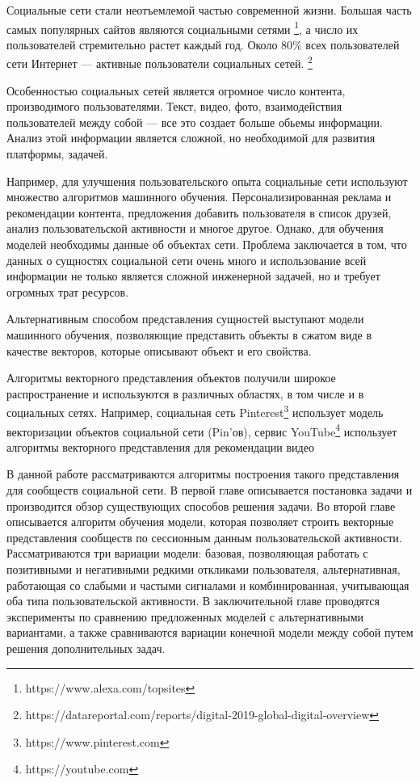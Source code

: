 \documentclass[times,specification,annotation]{itmo-student-thesis}
\begin{document}
\startprefacepage

\startrelatedwork

Социальные сети стали неотъемлемой частью современной жизни. Большая часть самых популярных сайтов являются социальными сетями \footnote{https://www.alexa.com/topsites}, а число их пользователей стремительно растет каждый год. Около 80\% всех пользователей сети Интернет --- активные пользователи социальных сетей. \footnote{https://datareportal.com/reports/digital-2019-global-digital-overview}  

Особенностью социальных сетей является огромное число контента, производимого пользователями. Текст, видео, фото, взаимодействия пользователей между собой --- все это создает больше обьемы информации. Анализ этой информации является сложной, но необходимой для развития платформы, задачей.

Например, для улучшения пользовательского опыта социальные сети используют множество алгоритмов машинного обучения. Персонализированная реклама и рекомендации контента, предложения добавить пользователя в список друзей, анализ пользовательской активности и многое другое. Однако, для обучения моделей необходимы данные об объектах сети. Проблема заключается в том, что данных о сущностях социальной сети очень много и использование всей информации не только является сложной инженерной задачей, но и требует огромных трат ресурсов.   

Альтернативным способом представления сущностей выступают модели машинного обучения, позволяющие представить объекты в сжатом виде в качестве векторов, которые описывают объект и его свойства.

Алгоритмы векторного представления объектов получили широкое распространение и используются в различных областях, в том числе и в социальных сетях. Например, социальная сеть Pinterest\footnote{https://www.pinterest.com} \cite{Liu2017} использует модель векторизации объектов социальной сети (Pin'ов), сервис YouTube\footnote{https://youtube.com} использует алгоритмы векторного представления для рекомендации видео\cite{Covington2016} 

В данной работе рассматриваются алгоритмы построения такого представления для сообществ социальной сети. В первой главе описывается постановка задачи и производится обзор существующих способов решения задачи. Во второй главе описывается алгоритм обучения модели, которая позволяет строить векторные представления сообществ по сессионным данным пользовательской активности. Рассматриваются три вариации модели: базовая, позволяющая работать с позитивными и негативными редкими откликами пользователя, альтернативная, работающая со слабыми и частыми сигналами и комбинированная, учитывающая оба типа пользовательской активности. В заключительной главе проводятся эксперименты по сравнению предложенных моделей с альтернативными вариантами, а также сравниваются вариации конечной модели между собой путем решения дополнительных задач. 
\end{document}
